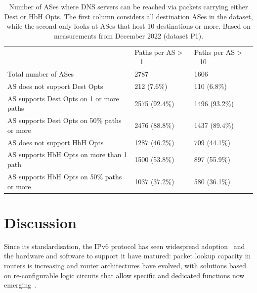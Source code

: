 \documentclass[conference]{IEEEtran}
\begin{document}
    \begin{table}
\begin{tabular}{p{}|p{}p{}}
                                          & Paths per AS$>$=1 & Paths per AS$>$=10 \\ \cline{1-3} 
Total number of ASes                      & 2787                                            & 1606                                            \\ \hline
AS does not support Dest Opts               & 212 (7.6\%)                                     & 110 (6.8\%)                                     \\
AS supports Dest Opts on 1 or more paths   & 2575 (92.4\%)                                   & 1496 (93.2\%)                                   \\
AS supports Dest Opts on 50\% paths or more & 2476  (88.8\%)                                  & 1437 (89.4\%)                                   \\ \hline
AS does not support HbH Opts               & 1287 (46.2\%)                                   & 709 (44.1\%)                                    \\
AS supports HbH Opts on more than 1 path   & 1500 (53.8\%)                                   & 897 (55.9\%)                                    \\
AS supports HbH Opts on 50\% paths or more & 1037 (37.2\%)                                   & 580 (36.1\%)                                   
\end{tabular}
\label{tbl:as_pathspider}
\caption{Number of ASes where DNS servers can be reached via packets carrying either Dest or HbH Opts. The first column considers all destination ASes in the dataset, while the second only looks at ASes that host 10 destinations or more. Based on measurements from December 2022 (dataset P1).}
\end{table}

\section{Discussion} 
\label{sec:discussion}

Since its standardisation, the IPv6 protocol has
seen widespread adoption~\cite{v6adoption_ton} and the hardware and software to
support it have matured: packet lookup capacity in routers is increasing and
router architectures have evolved, with solutions based on re-configurable
logic circuits that allow specific and dedicated functions now
emerging~\cite{cisco-silicon-one}.
\end{document}
